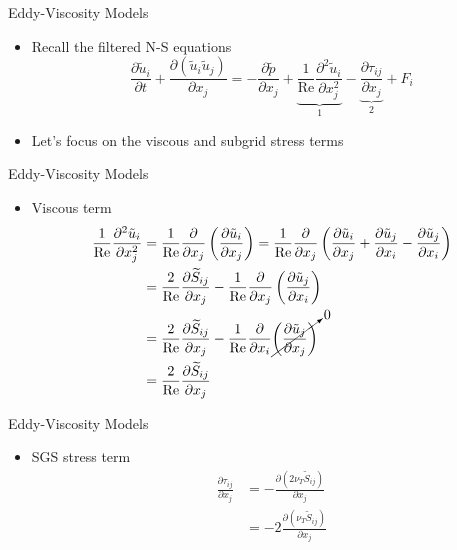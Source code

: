 \begin{frame}{Eddy-Viscosity Models}
\begin{itemize}
	\item Recall the filtered N-S equations
	$$\frac{\partial \tilde u_i}{\partial t} + \frac{\partial (\tilde u_i \tilde u_j)}{\partial x_j} = - \frac{\partial \tilde p}{\partial x_j} + \underbrace{\frac{1}{\text{Re}} \frac{\partial^2 \tilde u_i}{\partial x_j^{2}}}_{1} -\underbrace{\frac{\partial \tau_{ij}}{\partial x_j}}_{2}+ F_i$$
	\item Let's focus on the viscous and subgrid stress terms 
\end{itemize}

\end{frame}

\begin{frame}{Eddy-Viscosity Models}
\begin{itemize}
\item Viscous term
	\begin{align*}
		 \frac{1}{\text{Re}} \frac{\partial^2 \tilde u_i}{\partial x_j^{2}} &= \frac{1}{\text{Re}}\frac{\partial}{\partial x_j} \left(\frac{\partial \tilde u_i}{\partial x_j}\right) = \frac{1}{\text{Re}} \frac{\partial}{\partial x_j} \left(\frac{\partial \tilde u_i}{\partial x_j} + \frac{\partial \tilde u_j}{\partial x_i} - \frac{\partial \tilde u_j}{\partial x_i}\right)\\
		 &= \frac{2}{\text{Re}} \frac{\partial \widetilde{S}_{ij}}{\partial x_j} -  \frac{1}{\text{Re}} \frac{\partial}{\partial x_j} \left( \frac{\partial \tilde u_j}{\partial x_i}\right)\\
		 &= \frac{2}{\text{Re}} \frac{\partial \widetilde{S}_{ij}}{\partial x_j} -  \frac{1}{\text{Re}} \frac{\partial}{\partial x_i} \cancelto{0}{\left(\frac{\partial \tilde u_j}{\partial x_j}\right)}\\
		 &= \frac{2}{\text{Re}} \frac{\partial \widetilde{S}_{ij}}{\partial x_j}
	\end{align*}
\end{itemize}
\end{frame}

\begin{frame}{Eddy-Viscosity Models}
\begin{itemize}
\item SGS stress term
	\begin{align*}
		 \frac{\partial \tau_{ij}}{\partial x_j} &= -\frac{\partial (2 \nu_T \widetilde{S}_{ij})}{\partial x_j}\\
		 &= -2\frac{\partial (\nu_T \widetilde{S}_{ij})}{\partial x_j}
	\end{align*}
\end{itemize}
\end{frame}


